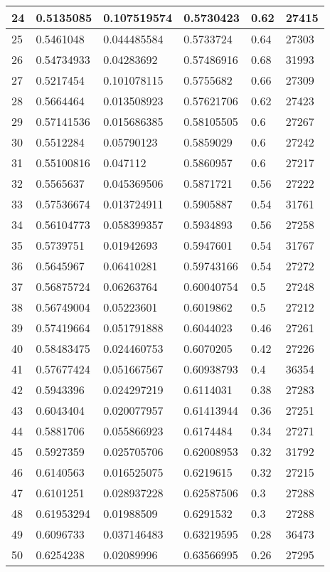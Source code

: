 \begin{longtable}{|l|l|l|l|l|l|}
24 & 0.5135085 & 0.107519574 & 0.5730423 & 0.62 & 27415 \\ \hline 
25 & 0.5461048 & 0.044485584 & 0.5733724 & 0.64 & 27303 \\ \hline 
26 & 0.54734933 & 0.04283692 & 0.57486916 & 0.68 & 31993 \\ \hline 
27 & 0.5217454 & 0.101078115 & 0.5755682 & 0.66 & 27309 \\ \hline 
28 & 0.5664464 & 0.013508923 & 0.57621706 & 0.62 & 27423 \\ \hline 
29 & 0.57141536 & 0.015686385 & 0.58105505 & 0.6 & 27267 \\ \hline 
30 & 0.5512284 & 0.05790123 & 0.5859029 & 0.6 & 27242 \\ \hline 
31 & 0.55100816 & 0.047112 & 0.5860957 & 0.6 & 27217 \\ \hline 
32 & 0.5565637 & 0.045369506 & 0.5871721 & 0.56 & 27222 \\ \hline 
33 & 0.57536674 & 0.013724911 & 0.5905887 & 0.54 & 31761 \\ \hline 
34 & 0.56104773 & 0.058399357 & 0.5934893 & 0.56 & 27258 \\ \hline 
35 & 0.5739751 & 0.01942693 & 0.5947601 & 0.54 & 31767 \\ \hline 
36 & 0.5645967 & 0.06410281 & 0.59743166 & 0.54 & 27272 \\ \hline 
37 & 0.56875724 & 0.06263764 & 0.60040754 & 0.5 & 27248 \\ \hline 
38 & 0.56749004 & 0.05223601 & 0.6019862 & 0.5 & 27212 \\ \hline 
39 & 0.57419664 & 0.051791888 & 0.6044023 & 0.46 & 27261 \\ \hline 
40 & 0.58483475 & 0.024460753 & 0.6070205 & 0.42 & 27226 \\ \hline 
41 & 0.57677424 & 0.051667567 & 0.60938793 & 0.4 & 36354 \\ \hline 
42 & 0.5943396 & 0.024297219 & 0.6114031 & 0.38 & 27283 \\ \hline 
43 & 0.6043404 & 0.020077957 & 0.61413944 & 0.36 & 27251 \\ \hline 
44 & 0.5881706 & 0.055866923 & 0.6174484 & 0.34 & 27271 \\ \hline 
45 & 0.5927359 & 0.025705706 & 0.62008953 & 0.32 & 31792 \\ \hline 
46 & 0.6140563 & 0.016525075 & 0.6219615 & 0.32 & 27215 \\ \hline 
47 & 0.6101251 & 0.028937228 & 0.62587506 & 0.3 & 27288 \\ \hline 
48 & 0.61953294 & 0.01988509 & 0.6291532 & 0.3 & 27288 \\ \hline 
49 & 0.6096733 & 0.037146483 & 0.63219595 & 0.28 & 36473 \\ \hline 
50 & 0.6254238 & 0.02089996 & 0.63566995 & 0.26 & 27295 \\ \hline 
\end{longtable}